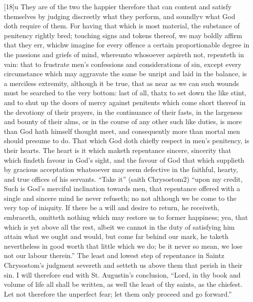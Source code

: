 [18]u They are of the two the happier therefore that can content and satisfy themselves by judging discreetly what they perform, and soundlyv what God doth require of them. For having that which is most material, the substance of penitency rightly bred; touching signs and tokens thereof, we may boldly affirm that they err, whichw imagine for every offence a certain proportionable degree in the passions and griefs of mind, whereunto whosoever aspireth not, repenteth in vain: that to frustrate men’s confessions and considerations of sin, except every circumstance which may aggravate the same be unript and laid in the balance, is a merciless extremity, although it be true, that as near as we can such wounds must be searched to the very bottom: last of all, thatx to set down the like stint, and to shut up the doors of mercy against penitents which come short thereof in the devotiony of their prayers, in the continuance of their fasts, in the largeness and bounty of their alms, or in the course of any other such like duties, is more than God hath himself thought meet, and consequently more than mortal men should presume to do. That which God doth chiefly respect in men’s penitency, is their hearts. The heart is it which maketh repentance sincere, sincerity that which findeth favour in God’s sight, and the favour of God that which supplieth by gracious acceptation whatsoever may seem defective in the faithful, hearty, and true offices of his servants. “Take it” (saith Chrysostom2) “upon my credit, Such is God’s merciful  inclination towards men, that repentance offered with a single and sincere mind he never refuseth; no not although we be come to the very top of iniquity. If there be a will and desire to return, he receiveth, embraceth, omitteth nothing which may restore us to former happiness; yea, that which is yet above all the rest, albeit we cannot in the duty of satisfying him attain what we ought and would, but come far behind our mark, he taketh nevertheless in good worth that little which we do; be it never so mean, we lose not our labour therein.” The least and lowest step of repentance in Saintz Chrysostom’s judgment severeth and setteth us above them that perish in their sin. I will therefore end with St. Augustin’s conclusion, “Lord, in thy book and volume of life all shall be written, as well the least of thy saints, as the chiefest. Let not therefore the unperfect fear; let them only proceed and go forward.”

